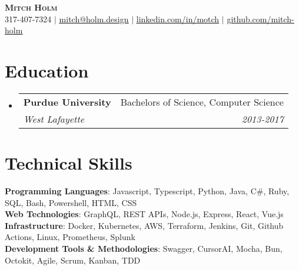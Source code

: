\documentclass[letterpaper,11pt]{article}
\makeatletter
\newcommand{\resumeSubheading}[4]{
  \vspace{-2pt}\item
    \begin{tabular*}{0.97\textwidth}[t]{l@{\extracolsep{\fill}}r}
      \textbf{#1} & #2 \\
      \textit{\small#3} & \textit{\small #4} \\
    \end{tabular*}\vspace{-7pt}
}
\newcommand{\resumeSubHeadingListStart}{\begin{itemize}[leftmargin=0.15in, label={}]}
\newcommand{\resumeSubHeadingListEnd}{\end{itemize}}
\makeatother
\begin{document}
\begin{center}
    \textbf{\Huge \scshape Mitch Holm} \\ \vspace{1pt}
    \small 317-407-7324 $|$ \href{mailto:mitch@holm.design}{\underline{mitch@holm.design}} 
    $|$ \href{https://www.linkedin.com/in/motch/}{\underline{linkedin.com/in/motch}} 
    $|$ \href{https://www.github.com/mitch-holm/}{\underline{github.com/mitch-holm}}
\end{center}


\section{Education}
  \resumeSubHeadingListStart
    \resumeSubheading
      {Purdue University}{Bachelors of Science, Computer Science}{West Lafayette}{2013-2017}
  \resumeSubHeadingListEnd


\section{Technical Skills}
 \begin{itemize}[leftmargin=0.15in, label={}]
    \small{\item{
      \textbf{Programming Languages}{: Javascript, Typescript, Python, Java, C\#, Ruby, SQL, Bash, Powershell, HTML, CSS} \\
      \textbf{Web Technologies}{: GraphQL, REST APIs, Node.js, Express, React, Vue.js} \\
      \textbf{Infrastructure}{: Docker, Kubernetes, AWS, Terraform, Jenkins, Git, Github Actions, Linux, Prometheus, Splunk} \\
      \textbf{Development Tools \& Methodologies}{: Swagger, CursorAI, Mocha, Bun, Octokit, Agile, Scrum, Kanban, TDD} \\
    }}
 \end{itemize}
\end{document}
